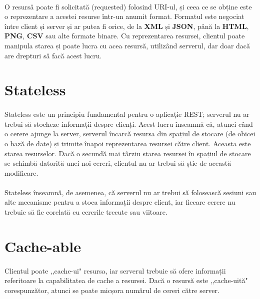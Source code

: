 \paragraph{} O resursă poate fi solicitată (requested) folosind URI-ul, și ceea ce se obține este o reprezentare a acestei resurse într-un anumit format. Formatul este negociat între client și server și ar putea fi orice, de la \textbf{XML} și \textbf{JSON}, până la \textbf{HTML}, \textbf{PNG}, \textbf{CSV} sau alte formate binare. Cu reprezentarea resursei, clientul poate manipula starea și poate lucra cu acea resursă, utilizând serverul, dar doar dacă are drepturi să facă acest lucru.\cite{19}

\section{Stateless}

\paragraph{} Stateless este un principiu fundamental pentru o aplicație REST; serverul nu ar trebui să stocheze informații despre clienți. Acest lucru înseamnă că, atunci când o cerere ajunge la server, serverul încarcă resursa din spațiul de stocare (de obicei o bază de date) și trimite înapoi reprezentarea resursei către client. Aceasta este starea resurselor. Dacă o secundă mai târziu starea resursei în spațiul de stocare se schimbă datorită unei noi cereri, clientul nu ar trebui să știe de această modificare.

\paragraph{} Stateless înseamnă, de asemenea, că serverul nu ar trebui să folosească sesiuni sau alte mecanisme pentru a stoca informații despre client, iar fiecare cerere nu trebuie să fie corelată cu cererile trecute sau viitoare.\cite{19}

\section{Cache-able}

\paragraph{}
Clientul poate ,,cache-ui" resursa, iar serverul trebuie să ofere informații referitoare la capabilitatea de cache a resursei. Dacă o resursă este ,,cache-uită" corespunzător, atunci se poate micșora numărul de cereri către server.\cite{19}

